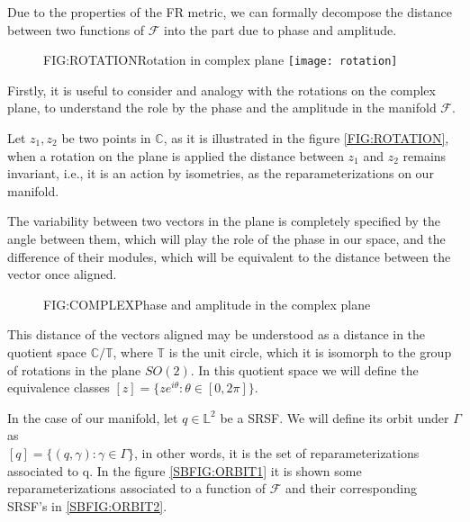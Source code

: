 
Due to the properties of the FR metric, we can formally decompose the distance
between two functions of $\mathcal{F}$ into the part due to phase and amplitude.

\begin{figure}[Rotation in complex plane]{FIG:ROTATION}{Rotation in complex plane}
	\texttt{[image: rotation]}
\end{figure}

Firstly, it is useful to consider and analogy with the rotations on the complex
plane, to understand the role by the phase and the amplitude in the manifold
$\mathcal{F}$.

Let $z_1, z_2$ be two points in $\mathbb{C}$, as it is illustrated in the
figure \ref{FIG:ROTATION}, when a rotation on the plane is applied the distance
between $z_1$ and $z_2$ remains invariant, i.e., it is an action by isometries, as the
reparameterizations on our manifold.

The variability between two vectors in the plane is completely specified by
the angle between them, which will play the role of the phase in our space, and
the difference of their modules, which will be equivalent to the distance
between the vector once aligned.

\begin{figure}[Phase and amplitude in the complex plane]{FIG:COMPLEX}{Phase and amplitude in the complex plane}

 \qquad
{}

\end{figure}


This distance of the vectors aligned may be understood as a distance in the
quotient space $\mathbb{C} / \mathbb{T}$, where $\mathbb{T}$ is the unit circle,
which it is isomorph to the group of rotations in the plane $SO(2)$. In this
quotient space we will define the equivalence classes
$[z] = \{z e^{i \theta} : \theta \in [0, 2\pi]\}$.

In the case of our manifold, let $q \in \mathbb{L}^2$ be a SRSF. We will define
its orbit under $\Gamma$ as \\$[q] = \{(q, \gamma) : \gamma \in \Gamma \}$, in
other words, it is the set of reparameterizations associated to q. In the
figure \ref{SBFIG:ORBIT1} it is shown some reparameterizations associated  to a function
of $\mathscr{F}$ and their corresponding SRSF's in \ref{SBFIG:ORBIT2}.


